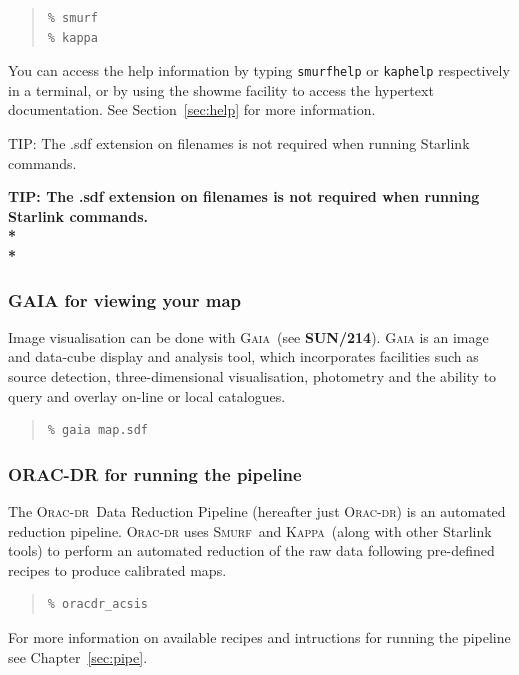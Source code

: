 \documentclass[twoside,11pt]{article}
\newcommand{\htmladdnormallink}[2]{#1}
\newcommand{\htmlref}[2]{#1}
\newenvironment{latexonly}{}{}
\newcommand{\latexhtml}[2]{#1}
\newcommand{\xref}[3]{#1}
\renewcommand{\_}{\texttt{\symbol{95}}}
\newenvironment{fmpage}[1]{\begin{lrbox}{\fmbox}\begin{minipage}{#1}}{\end{minipage}\end{lrbox}\fbox{\usebox{\fmbox}}}
\newenvironment{myquote}{
   \color{MidnightBlue}\begin{quote}\begin{small}}{
   \end{small}\end{quote}
}
\newcommand{\gaia}{\xref{\textsc{Gaia}}{sun214}{}}
\newcommand{\Kappa}{\xref{\textsc{Kappa}}{sun95}{}}
\newcommand{\oracdr}{\htmladdnormallink{\textsc{Orac-dr}}{http://www.oracdr.org/oracdr}}
\newcommand{\smurf}{\xref{\textsc{Smurf}}{sun258}{}}
\newcommand{\task}[1]{\textsf{#1}}
\newcommand{\gaiasun}{\xref{\textbf{SUN/214}}{sun214}{}}
\newcommand{\cref}[3]{\latexhtml{#1~\ref{#2}}{\htmlref{#3}{#2}}}
\renewenvironment{myquote}{
      \begin{quote}\begin{small}}{
      \end{small}\end{quote}
   }
\begin{document}
\begin{myquote}
\begin{verbatim}
% smurf
% kappa
\end{verbatim}
\end{myquote}

You can access the help information by typing \texttt{smurfhelp} or
\texttt{kaphelp} respectively in a terminal, or by using the
\task{showme} facility to access the hypertext documentation. See
\cref{Section}{sec:help}{How to get help} for more information.


\begin{latexonly}
\begin{center}
\begin{fmpage}{0.95\linewidth}
\vspace{0.1cm}
TIP: The .sdf extension on filenames is not required when running Starlink commands.
\end{fmpage}
\end{center}
\end{latexonly}

\begin{htmlonly}
\textbf{TIP: The .sdf extension on filenames is not required when running Starlink commands.\\*\\*}
\end{htmlonly}
\vspace{0.5cm}

\subsubsection{GAIA for viewing your map}

Image visualisation can be done with \gaia\ (see \gaiasun). \textsc{Gaia} is an
image and data-cube display and analysis tool, which incorporates facilities such
as source detection, three-dimensional visualisation, photometry and the ability
to query and overlay on-line or local catalogues.
\begin{myquote}
\begin{verbatim}
% gaia map.sdf
\end{verbatim}
\end{myquote}

\subsubsection{ORAC-DR for running the pipeline}

The \oracdr\ Data Reduction Pipeline \cite{oracdr} (hereafter just
\textsc{Orac-dr}) is an automated reduction pipeline. \textsc{Orac-dr} uses
\smurf\ and \Kappa\ (along with other Starlink tools) to perform an automated
reduction of the raw data following pre-defined recipes to produce
calibrated maps.
\begin{myquote}
\begin{verbatim}
% oracdr_acsis
\end{verbatim}
\end{myquote}
For more information on available recipes and intructions for running the pipeline
see \cref{Chapter}{sec:pipe}{The SCUBA-2 Pipeline}.
\end{document}
